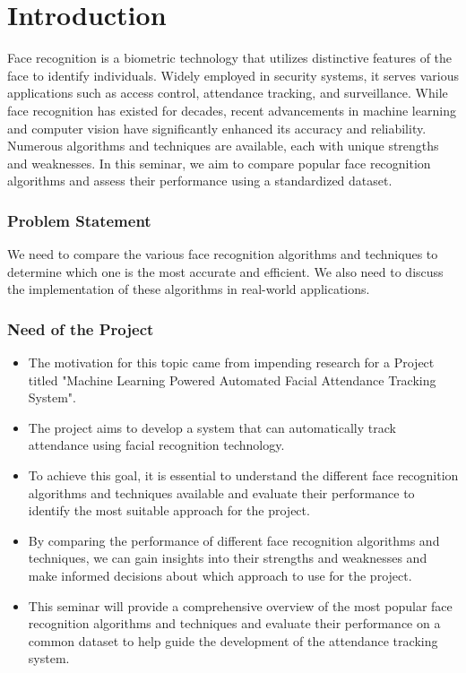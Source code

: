 \documentclass[openany]{report}
\begin{document}
\tableofcontents
\thispagestyle{empty}
\clearpage
 
\chapter{Introduction}

Face recognition is a biometric technology that utilizes distinctive features of the face to identify individuals. Widely employed in security systems, it serves various applications such as access control, attendance tracking, and surveillance. While face recognition has existed for decades, recent advancements in machine learning and computer vision have significantly enhanced its accuracy and reliability. Numerous algorithms and techniques are available, each with unique strengths and weaknesses. In this seminar, we aim to compare popular face recognition algorithms and assess their performance using a standardized dataset.

\subsection{Problem Statement}
We need to compare the various face recognition algorithms and techniques to determine which one is the most accurate and efficient. We also need to discuss the implementation of these algorithms in real-world applications.

\subsection{Need of the Project}

\begin{itemize}
    \item The motivation for this topic came from impending research for a Project titled "Machine Learning Powered Automated Facial Attendance Tracking System".
    \item The project aims to develop a system that can automatically track attendance using facial recognition technology.
    \item To achieve this goal, it is essential to understand the different face recognition algorithms and techniques available and evaluate their performance to identify the most suitable approach for the project.
    \item By comparing the performance of different face recognition algorithms and techniques, we can gain insights into their strengths and weaknesses and make informed decisions about which approach to use for the project.
    \item This seminar will provide a comprehensive overview of the most popular face recognition algorithms and techniques and evaluate their performance on a common dataset to help guide the development of the attendance tracking system.
\end{itemize}
\end{document}
